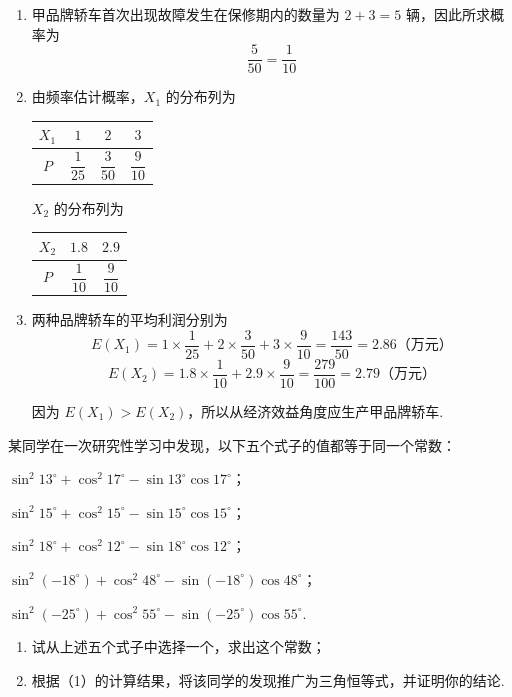 \begin{solution}
\begin{enumerate}
\item 甲品牌轿车首次出现故障发生在保修期内的数量为 \(2+3=5\) 辆，因此所求概率为
\[
\frac{5}{50}=\frac{1}{10}
\]

\item 由频率估计概率，\(X_{1}\) 的分布列为
\begin{center}
\begin{tabular}{c|ccc}
\hline
\(X_{1}\) & \(1\) & \(2\) & \(3\) \\
\hline
\(P\) & \(\dfrac{1}{25}\) & \(\dfrac{3}{50}\) & \(\dfrac{9}{10}\) \\
\hline
\end{tabular}
\end{center}

\(X_{2}\) 的分布列为
\begin{center}
\begin{tabular}{c|cc}
\hline
\(X_{2}\) & \(1.8\) & \(2.9\) \\
\hline
\(P\) & \(\dfrac{1}{10}\) & \(\dfrac{9}{10}\) \\
\hline
\end{tabular}
\end{center}

\item 两种品牌轿车的平均利润分别为
\[
E(X_{1})=1\times\frac{1}{25}+2\times\frac{3}{50}+3\times\frac{9}{10}
=\frac{143}{50}=2.86\text{（万元）}
\]
\[
E(X_{2})=1.8\times\frac{1}{10}+2.9\times\frac{9}{10}
=\frac{279}{100}=2.79\text{（万元）}
\]

因为 \(E(X_{1})>E(X_{2})\)，所以从经济效益角度应生产甲品牌轿车.
\end{enumerate}
\end{solution}

\begin{problem}
某同学在一次研究性学习中发现，以下五个式子的值都等于同一个常数：

\begin{circlelist}
\item \(\sin^{2}13^{\circ} + \cos^{2}17^{\circ} - \sin13^{\circ}\cos17^{\circ}\)；
\item \(\sin^{2}15^{\circ} + \cos^{2}15^{\circ} - \sin15^{\circ}\cos15^{\circ}\)；
\item \(\sin^{2}18^{\circ} + \cos^{2}12^{\circ} - \sin18^{\circ}\cos12^{\circ}\)；
\item \(\sin^{2}(-18^{\circ}) + \cos^{2}48^{\circ} - \sin(-18^{\circ})\cos48^{\circ}\)；
\item \(\sin^{2}(-25^{\circ}) + \cos^{2}55^{\circ} - \sin(-25^{\circ})\cos55^{\circ}\).
\end{circlelist}

\begin{enumerate}
\item 试从上述五个式子中选择一个，求出这个常数；
\item 根据（1）的计算结果，将该同学的发现推广为三角恒等式，并证明你的结论.
\end{enumerate}
\end{problem}


